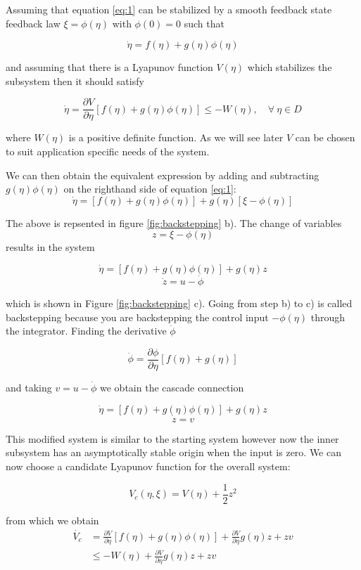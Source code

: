 Assuming that equation \ref{eq:1} can be stabilized by a smooth feedback state feedback law $\xi=\phi(\eta)$ with $\phi(0)=0$ \cite{khalilNonlinearSystems2002} such that 

$$
    \dot{\eta} = f(\eta) + g(\eta)\phi(\eta)
$$

and assuming that there is a Lyapunov function $V(\eta)$ which stabilizes the subsystem then it should satisfy

\begin{equation}
\dot{\eta} = \frac{\partial V}{\partial \eta}[f(\eta) + g(\eta)\phi(\eta)] \leq -W(\eta), \quad \forall \ \eta \in D
\end{equation}

where $W(\eta)$ is a positive definite function. As we will see later $V$ can be chosen to suit application specific needs of the system.

We can then obtain the equivalent expression by adding and subtracting $g(\eta)\phi(\eta)$ on the righthand side of equation \ref{eq:1}:
\begin{equation}
    \dot{\eta} = [f(\eta) + g(\eta)\phi(\eta)] + g(\eta)[\xi - \phi(\eta)] 
\end{equation}

The above is repsented in figure \ref{fig:backstepping} b). The change of variables 
$$ z = \xi - \phi(\eta) $$
results in the system 

$$ \dot{\eta} = [f(\eta) + g(\eta)\phi(\eta)] + g(\eta)z  $$
$$ \dot{z} = u - \dot{\phi} $$

which is shown in Figure \ref{fig:backstepping} c). Going from step b) to c) is called backstepping because you are backstepping the control input $-\phi(\eta)$ through the integrator. Finding the derivative $\dot{\phi}$ 

$$ \dot{\phi} = \frac{\partial \phi}{\partial \eta} [f(\eta) + g(\eta)] $$

and taking $v = u - \dot{\phi}$ we obtain the cascade connection

$$ \dot{\eta} = [f(\eta) + g(\eta)\phi(\eta)] + g(\eta)z  $$
$$ \dot{z} = v $$

This modified system is similar to the starting system however now the inner subsystem has an asymptotically stable origin when the input is zero. We can now choose a candidate Lyapunov function for the overall system:

$$ V_c (\eta,\xi) = V(\eta) + \frac{1}{2}z^2 $$

from which we obtain
\begin{align}
    \dot{V_c} &= \frac{\partial V}{\partial \eta}[f(\eta) + g(\eta)\phi(\eta)] + \frac{\partial V}{\partial \eta}g(\eta)z + zv \\
    &\leq -W(\eta) + \frac{\partial V}{\partial \eta}g(\eta)z + zv
\end{align}

